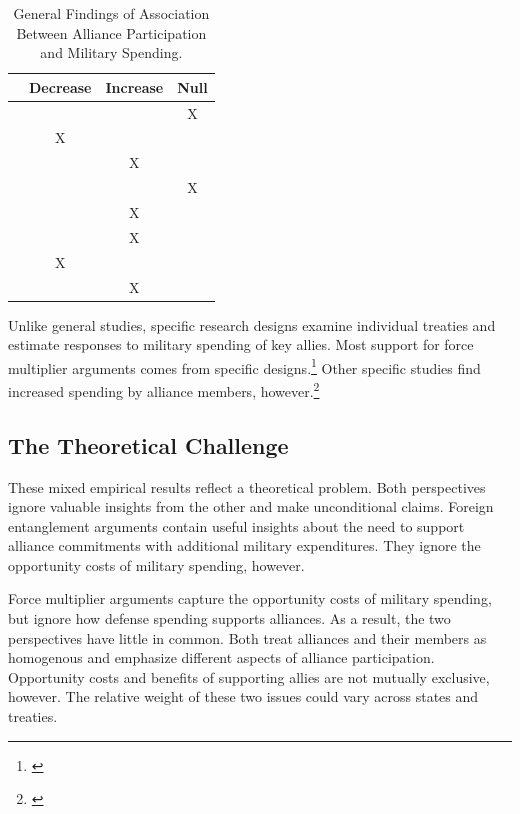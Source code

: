 \documentclass[12pt]{article}
\begin{document}
\begin{table}[hbt!]
\begin{center}
\begin{tabular}{lccc}
     & Decrease & Increase & Null \\
\hline
\citet{MostSiverson1987} &  &  & X \\
\citet{Conybeare1994} & X & &  \\
\citet{Diehl1994} &  & X &  \\
\citet{Goldsmith2003} &  &  & X \\
\citet{MorganPalmer2006} &  & X & \\ 
\citet{QuirozFlores2011} &  & X &  \\ 
\citet{DigiuseppePoast2016} & X &  & \\ 
\citet{Horowitzetal2017} &  & X & \\ 
\hline
\end{tabular}
\caption{General Findings of Association Between Alliance Participation and Military Spending.}
\label{tab:results-sum}
\end{center} 
\end{table}


Unlike general studies, specific research designs examine individual treaties and estimate responses to military spending of key allies. 
Most support for force multiplier arguments comes from specific designs.\footnote{\citep{BarnettLevy1991, Morrow1993, Sorokin1994, PluemperNeumayer2015}}
Other specific studies find increased spending by alliance members, however.\footnote{\citep{ConybeareSandler1990, Chenetal1996}}


\subsection{The Theoretical Challenge}


These mixed empirical results reflect a theoretical problem. 
Both perspectives ignore valuable insights from the other and make unconditional claims.  
Foreign entanglement arguments contain useful insights about the need to support alliance commitments with additional military expenditures.
They ignore the opportunity costs of military spending, however. 


Force multiplier arguments capture the opportunity costs of military spending, but ignore how defense spending supports alliances. 
As a result, the two perspectives have little in common. 
Both treat alliances and their members as homogenous and emphasize different aspects of alliance participation. 
Opportunity costs and benefits of supporting allies are not mutually exclusive, however. 
The relative weight of these two issues could vary across states and treaties. 
\end{document}
